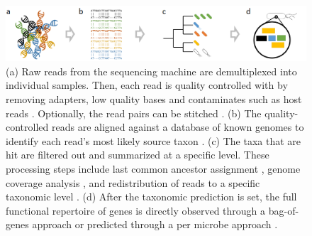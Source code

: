 \begin{figure}[hbt]
    \centering
    \includegraphics[width=.8\linewidth]{fig/taxonomic_profiler.png}
    \caption{
        (a) Raw reads from the sequencing machine are demultiplexed into individual samples. Then, each read is quality controlled with by removing adapters, low quality bases and contaminates such as host reads \cite{consortium_structure_2012}. Optionally, the read pairs can be stitched \cite{magoc_flash:_2011}. (b) The quality-controlled reads are aligned against a database of known genomes to identify each read's most likely source taxon \cite{langmead_fast_2012}. (c) The taxa that are hit are filtered out and summarized at a specific level. These processing steps include last common ancestor assignment \cite{hong_pathoscope_2014}, genome coverage analysis \cite{wood_kraken:_2014}, and redistribution of reads to a specific taxonomic level \cite{lu_bracken:_2017}. (d) After the taxonomic prediction is set, the full functional repertoire of genes is directly observed through a bag-of-genes approach or predicted through a per microbe approach \cite{langille_predictive_2013}.
    }
    \label{fig:taxonomic_profiler}
\end{figure}


